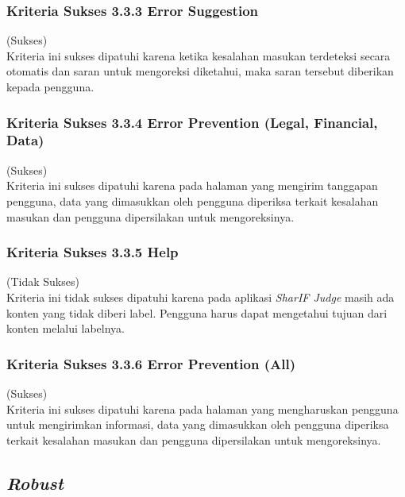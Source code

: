 \documentclass[a4paper,twoside]{article}
\begin{document}
\begin{enumerate}
		\subsubsection*{Kriteria Sukses 3.3.3 Error Suggestion}
		\label{subsubsec:kepatuhan_kriteria_3.3.3}
		(Sukses) \\
		
		Kriteria ini sukses dipatuhi karena ketika kesalahan masukan terdeteksi secara otomatis dan saran untuk mengoreksi diketahui, maka saran tersebut diberikan kepada pengguna.
		
		\subsubsection*{Kriteria Sukses 3.3.4 Error Prevention (Legal, Financial, Data)}
		\label{subsubsec:kepatuhan_kriteria_3.3.4}
		(Sukses) \\
		
		Kriteria ini sukses dipatuhi karena pada halaman yang mengirim tanggapan pengguna, data yang dimasukkan oleh pengguna diperiksa terkait kesalahan masukan dan pengguna dipersilakan untuk mengoreksinya.
		
		\subsubsection*{Kriteria Sukses 3.3.5 Help}
		\label{subsubsec:kepatuhan_kriteria_3.3.5}
		(Tidak Sukses) \\
		
		Kriteria ini tidak sukses dipatuhi karena
		pada aplikasi \textit{SharIF Judge} masih ada konten yang tidak diberi label. Pengguna harus dapat mengetahui tujuan dari konten melalui labelnya.
		
		\subsubsection*{Kriteria Sukses 3.3.6 Error Prevention (All)}
		\label{subsubsec:kepatuhan_kriteria_3.3.6}
		(Sukses) \\
		
		Kriteria ini sukses dipatuhi karena pada halaman yang mengharuskan pengguna untuk mengirimkan informasi, data yang dimasukkan oleh pengguna diperiksa terkait kesalahan masukan dan pengguna dipersilakan untuk mengoreksinya.
		
		\subsection*{\textit{Robust}}
		\label{subsec:kepatuhan_robust}
		

\end{enumerate}
\end{document}
